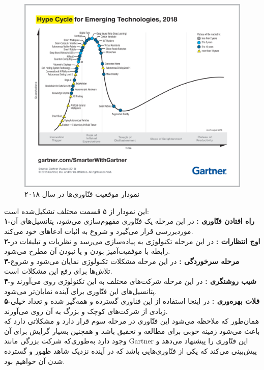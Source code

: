 \begin{figure}[tb]
	\centering
	\includegraphics[width=1\linewidth]{image/gartner}
	\caption {نمودار موقعیت فنّاوری‌ها در سال ۲۰۱۸}
	\label{fig:gartner}
\end{figure}
\noindent
این نمودار از ۵ قسمت مختلف تشکیل‌شده است: 
\\
\textbf{
	۱-راه افتادن فنّاوری  : }در این مرحله یک فنّاوری مفهوم‌سازی می‌شود، پتانسیل‌های آن موردبررسی قرار می‌گیرد و شروع به اثبات ادعاهای خود می‌کند.
\\
\textbf{
	۲-اوج انتظارات  : }در این مرحله تکنولوژی به پیاده‌سازی می‌رسد و نظریات و تبلیغات در رابطه با موفقیت‌آمیز بودن و یا نبودن آن مطرح می‌شود.
\\
\textbf{
	۳-مرحله سرخوردگی  :} در این مرحله مشکلات تکنولوژی نمایان می‌شود و شروع تلاش‌ها برای رفع این مشکلات است.
\\
\textbf{
	۴-شیب روشنگری  :} در این مرحله شرکت‌های مختلف به این تکنولوژی روی می‌آورند و پتانسیل‌های این فنّاوری برای آینده نمایان‌تر می‌شود.
\\
\textbf{
	۵-فلات بهره‌وری  :} در اینجا استفاده از این فناوری گسترده و همه‌گیر شده و تعداد خیلی زیادی از شرکت‌های کوچک و بزرگ به آن روی می‌آورند.
\\
همان‌طور که ملاحظه می‌شود این فنّاوری در مرحله سوم قرار دارد و مشکلاتی دارد که باعث می‌شود زمینه خوبی برای مطالعه و تحقیق باشد و همچنین بسیار گرایش برای آن وجود دارد به‌طوری‌که شرکت بزرگی مانند Gartner این فنّاوری را پیشنهاد می‌دهد و پیش‌بینی می‌کند که یکی از فنّاوری‌هایی باشد که در آینده نزدیک شاهد ظهور و گسترده شدن آن خواهیم بود.
